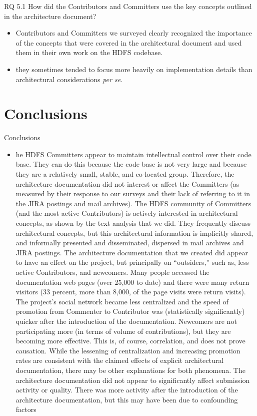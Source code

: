 \documentclass[t,14pt,mathserif]{beamer}
\begin{document}
\begin{frame}{RQ 5.1 How did the Contributors and Committers use the key concepts outlined in the architecture document?}
	\begin{itemize}
		\item Contributors and Committers we surveyed clearly recognized the importance of the concepts that were covered in the architectural document and used them in their own work on the HDFS codebase.
		\item they sometimes tended to focus more heavily on implementation details than architectural considerations \textit{per se}.		
	\end{itemize}
	
\end{frame}


\section{Conclusions}
\begin{frame}{Conclusions}
	\begin{itemize}
		\item he HDFS Committers appear to maintain intellectual control over their code base. They can do this because the code base is not very large and because they are a relatively small, stable, and co-located group. Therefore, the architecture documentation did not interest or affect the Committers (as measured by their response to our surveys and their lack of referring to it in the JIRA postings and mail archives).
		The HDFS community of Committers (and the most active Contributors) is actively interested in architectural concepts, as shown by the text analysis that we did. They frequently discuss architectural concepts, but this architectural information is implicitly shared, and informally presented and disseminated, dispersed in mail archives and JIRA postings.
		The architecture documentation that we created did appear to have an effect on the project, but principally on “outsiders,” such as, less active Contributors, and newcomers. Many people accessed the documentation web pages (over 25,000 to date) and there were many return visitors (33 percent, more than 8,000, of the page visits were return visits).
		The project's social network became less centralized and the speed of promotion from Commenter to Contributor was (statistically significantly) quicker after the introduction of the documentation. Newcomers are not participating more (in terms of volume of contributions), but they are becoming more effective. This is, of course, correlation, and does not prove causation. While the lessening of centralization and increasing promotion rates are consistent with the claimed effects of explicit architectural documentation, there may be other explanations for both phenomena.
		The architecture documentation did not appear to significantly affect submission activity or quality. There was more activity after the introduction of the architecture documentation, but this may have been due to confounding factors
	\end{itemize}
	
\end{frame}
\end{document}

